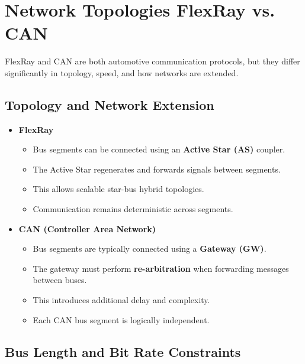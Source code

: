 \clearpage
\section{Network Topologies
FlexRay vs. CAN}
FlexRay and CAN are both automotive communication protocols, but they differ significantly in topology, speed, and how networks are extended.

\subsection*{Topology and Network Extension}

\begin{itemize}
    \item \textbf{FlexRay}
    \begin{itemize}
        \item Bus segments can be connected using an \textbf{Active Star (AS)} coupler.
        \item The Active Star regenerates and forwards signals between segments.
        \item This allows scalable star-bus hybrid topologies.
        \item Communication remains deterministic across segments.
    \end{itemize}

    \item \textbf{CAN (Controller Area Network)}
    \begin{itemize}
        \item Bus segments are typically connected using a \textbf{Gateway (GW)}.
        \item The gateway must perform \textbf{re-arbitration} when forwarding messages between buses.
        \item This introduces additional delay and complexity.
        \item Each CAN bus segment is logically independent.
    \end{itemize}
\end{itemize}

\subsection*{Bus Length and Bit Rate Constraints}

